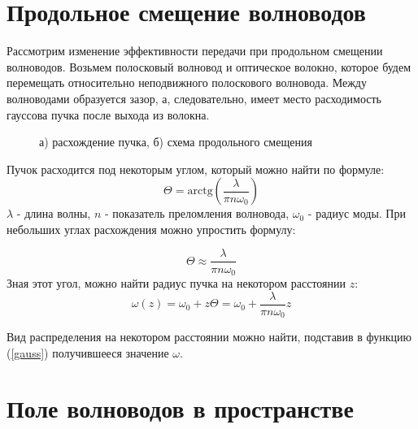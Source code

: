 \section{Продольное смещение волноводов}
Рассмотрим изменение эффективности передачи при продольном смещении волноводов. Возьмем полосковый волновод и оптическое волокно, которое будем перемещать относительно неподвижного полоскового волновода. Между волноводами образуется зазор, а, следовательно, имеет место расходимость гауссова пучка после выхода из волокна.
\begin{figure}[h!]
	\begin{minipage}[h]{0.49\linewidth}
	\end{minipage}
	\hfill
	\begin{minipage}[h]{0.49\linewidth}
	\end{minipage}
	\caption{а) расхождение пучка, б) схема продольного смещения}
\end{figure}

Пучок расходится под некоторым углом, который можно найти по формуле\cite{okamoto}:
\begin{equation}
	\Theta = \mathrm{arctg}(\frac{\lambda}{\pi n \omega_0})
\end{equation}
$\lambda$ - длина волны, $n$ - показатель преломления волновода, $\omega_0$ - радиус моды. При небольших углах расхождения можно упростить формулу:

\begin{equation}
	\Theta \approx \frac{\lambda}{\pi n \omega_0}
\end{equation}
Зная этот угол, можно найти радиус пучка на некотором расстоянии $z$:
\begin{equation}
	\omega(z) = \omega_0 + z\Theta = \omega_0 + \frac{\lambda}{\pi n \omega_0}z
\end{equation}

Вид распределения на некотором расстоянии можно найти, подставив в функцию (\ref{gauss}) получившееся значение $\omega$.

\section{Поле волноводов в пространстве}

